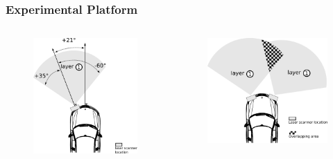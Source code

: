 \documentclass{beamer}
\begin{document}
	\begin{frame}
		\frametitle{Experimental Platform}	
		 \begin{columns}[t]
		  \begin{column}{5cm}
		  \begin{figure}[h]
			\center
			\includegraphics[scale=0.3]{../img/fig:demonstrator:superior}
		  \end{figure}
		  \end{column}
		  
		  \begin{column}{5cm}
		  \begin{figure}[h]
			\center
			\includegraphics[scale=0.3]{../img/fig:demonstrator:superior:overlap}
		  \end{figure}   
		  \end{column}
		 \end{columns} 	
	

\end{frame}
\end{document}
